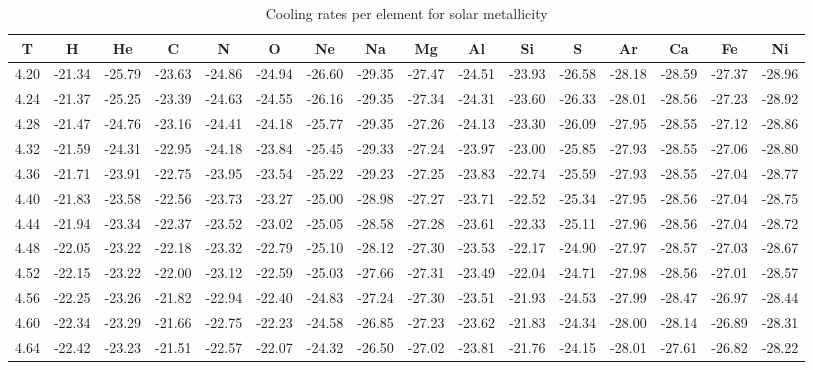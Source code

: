 \documentclass[floatfix,traditabstract,preprint2]{aa}
\begin{document}
\begin{table}
\centering                 
\caption{\textrm{Cooling rates per element for solar metallicity} }           
\label{table:KSabun}        
\begin{tabular}{c  c c c c c c c c c c c c c c c}       
\hline\hline               
\tiny
T & H & He & C & N & O & Ne & Na & Mg & Al & Si & S & Ar & Ca & Fe & Ni\\
\hline
4.20 & -21.34 & -25.79 & -23.63 & -24.86 & -24.94 & -26.60 & -29.35 & -27.47 & -24.51 & -23.93 & -26.58 & -28.18 & -28.59 & -27.37 & -28.96\\
4.24 & -21.37 & -25.25 & -23.39 & -24.63 & -24.55 & -26.16 & -29.35 & -27.34 & -24.31 & -23.60 & -26.33 & -28.01 & -28.56 & -27.23 & -28.92\\
4.28 & -21.47 & -24.76 & -23.16 & -24.41 & -24.18 & -25.77 & -29.35 & -27.26 & -24.13 & -23.30 & -26.09 & -27.95 & -28.55 & -27.12 & -28.86\\
4.32 & -21.59 & -24.31 & -22.95 & -24.18 & -23.84 & -25.45 & -29.33 & -27.24 & -23.97 & -23.00 & -25.85 & -27.93 & -28.55 & -27.06 & -28.80\\
4.36 & -21.71 & -23.91 & -22.75 & -23.95 & -23.54 & -25.22 & -29.23 & -27.25 & -23.83 & -22.74 & -25.59 & -27.93 & -28.55 & -27.04 & -28.77\\
4.40 & -21.83 & -23.58 & -22.56 & -23.73 & -23.27 & -25.00 & -28.98 & -27.27 & -23.71 & -22.52 & -25.34 & -27.95 & -28.56 & -27.04 & -28.75\\
4.44 & -21.94 & -23.34 & -22.37 & -23.52 & -23.02 & -25.05 & -28.58 & -27.28 & -23.61 & -22.33 & -25.11 & -27.96 & -28.56 & -27.04 & -28.72\\
4.48 & -22.05 & -23.22 & -22.18 & -23.32 & -22.79 & -25.10 & -28.12 & -27.30 & -23.53 & -22.17 & -24.90 & -27.97 & -28.57 & -27.03 & -28.67\\
4.52 & -22.15 & -23.22 & -22.00 & -23.12 & -22.59 & -25.03 & -27.66 & -27.31 & -23.49 & -22.04 & -24.71 & -27.98 & -28.56 & -27.01 & -28.57\\
4.56 & -22.25 & -23.26 & -21.82 & -22.94 & -22.40 & -24.83 & -27.24 & -27.30 & -23.51 & -21.93 & -24.53 & -27.99 & -28.47 & -26.97 & -28.44\\
4.60 & -22.34 & -23.29 & -21.66 & -22.75 & -22.23 & -24.58 & -26.85 & -27.23 & -23.62 & -21.83 & -24.34 & -28.00 & -28.14 & -26.89 & -28.31\\
4.64 & -22.42 & -23.23 & -21.51 & -22.57 & -22.07 & -24.32 & -26.50 & -27.02 & -23.81 & -21.76 & -24.15 & -28.01 & -27.61 & -26.82 & -28.22\\

\end{tabular}
\end{table}
\end{document}
